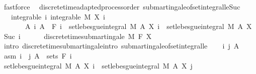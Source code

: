\begin{isabellebody}
\ fastforce\isanewline
{}\isamarkupfalse%
%
\endisatagproof
{\isafoldproof}%
%
\isadelimproof
\isanewline
%
\endisadelimproof
\isanewline
{}\isamarkupfalse%
\ {\isacharparenleft}{\kern0pt}\ discrete{\isacharunderscore}{\kern0pt}time{\isacharunderscore}{\kern0pt}adapted{\isacharunderscore}{\kern0pt}process{\isacharunderscore}{\kern0pt}order{\isacharparenright}{\kern0pt}\ submartingale{\isacharunderscore}{\kern0pt}of{\isacharunderscore}{\kern0pt}set{\isacharunderscore}{\kern0pt}integral{\isacharunderscore}{\kern0pt}le{\isacharunderscore}{\kern0pt}Suc{\isacharcolon}{\kern0pt}\isanewline
\ \ \ integrable{\isacharcolon}{\kern0pt}\ {\isachardoublequoteopen}{\isasymAnd}i{\isachardot}{\kern0pt}\ integrable\ M\ {\isacharparenleft}{\kern0pt}X\ i{\isacharparenright}{\kern0pt}{\isachardoublequoteclose}\ \isanewline
\ \ \ \ \ \ \ {\isachardoublequoteopen}{\isasymAnd}A\ i{\isachardot}{\kern0pt}\ A\ {\isasymin}\ F\ i\ {\isasymLongrightarrow}\ set{\isacharunderscore}{\kern0pt}lebesgue{\isacharunderscore}{\kern0pt}integral\ M\ A\ {\isacharparenleft}{\kern0pt}X\ i{\isacharparenright}{\kern0pt}\ {\isasymle}\ set{\isacharunderscore}{\kern0pt}lebesgue{\isacharunderscore}{\kern0pt}integral\ M\ A\ {\isacharparenleft}{\kern0pt}X\ {\isacharparenleft}{\kern0pt}Suc\ i{\isacharparenright}{\kern0pt}{\isacharparenright}{\kern0pt}{\isachardoublequoteclose}\ \isanewline
\ \ \ \ \ {\isachardoublequoteopen}discrete{\isacharunderscore}{\kern0pt}time{\isacharunderscore}{\kern0pt}submartingale\ M\ F\ X{\isachardoublequoteclose}\isanewline
%
\isadelimproof
%
\endisadelimproof
%
\isatagproof
{}\isamarkupfalse%
\ {\isacharparenleft}{\kern0pt}intro\ discrete{\isacharunderscore}{\kern0pt}time{\isacharunderscore}{\kern0pt}submartingale{\isachardot}{\kern0pt}intro\ submartingale{\isacharunderscore}{\kern0pt}of{\isacharunderscore}{\kern0pt}set{\isacharunderscore}{\kern0pt}integral{\isacharunderscore}{\kern0pt}le{\isacharparenright}{\kern0pt}\isanewline
\ \ \isamarkupfalse%
\ i\ j\ A\ \isamarkupfalse%
\ asm{\isacharcolon}{\kern0pt}\ {\isachardoublequoteopen}i\ {\isasymle}\ j{\isachardoublequoteclose}\ {\isachardoublequoteopen}A\ {\isasymin}\ sets\ {\isacharparenleft}{\kern0pt}F\ i{\isacharparenright}{\kern0pt}{\isachardoublequoteclose}\isanewline
\ \ \isamarkupfalse%
\ {\isachardoublequoteopen}set{\isacharunderscore}{\kern0pt}lebesgue{\isacharunderscore}{\kern0pt}integral\ M\ A\ {\isacharparenleft}{\kern0pt}X\ i{\isacharparenright}{\kern0pt}\ {\isasymle}\ set{\isacharunderscore}{\kern0pt}lebesgue{\isacharunderscore}{\kern0pt}integral\ M\ A\ {\isacharparenleft}{\kern0pt}X\ j{\isacharparenright}{\kern0pt}{\isachardoublequoteclose}\ \isamarkupfalse%

\end{isabellebody}
